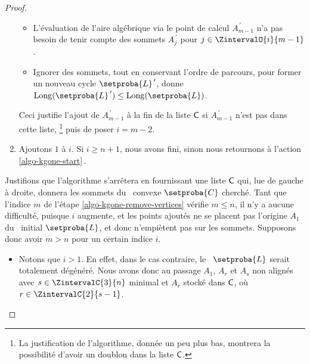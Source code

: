 \begin{proof}
\begin{enumerate}[label=\fbox{\small\bfseries\textsf{A\kern.25pt\arabic*}}]
\begin{itemize}
            \item L'évaluation de l'aire algébrique via le point de calcul $A^{\,\prime}_{m-1}$ n'a pas besoin de tenir compte des sommets $A^{\,\prime}_j$ pour $j \in \ZintervalO{i}{m-1}$.

            \item Ignorer des sommets, tout en conservant l'ordre de parcours, pour former un nouveau cycle $\setproba{L}^{\,\prime}$, donne $\cyclelen{\setproba{L}^{\,\prime}} \leq \cyclelen{\setproba{L}} $.
        \end{itemize}
        
        \noindent
        Ceci justifie l'ajout de
        $A^{\,\prime}_{m-1}$ à la fin de la liste $\mathsf{C}$ si $A^{\,\prime}_{m-1}$ n'est pas dans cette liste,%
        \footnote{
        	La justification de l'algorithme, donnée un peu plus bas, montrera la possibilité d'avoir un doublon dans la liste $\mathsf{C}$.
        }
        puis de poser $i = m - 2$.

	
		\item \label{algo-kgone-loop-back}
		Ajoutons $1$ à $i$.
		Si $i \geq n+1$, nous avons fini, sinon nous retournons à l'action \ref{algo-kgone-start}\,.
    \end{enumerate}
    
    \medskip
    
    Justifions que l'algorithme s'arrêtera en fournissant une liste $\mathsf{C}$ qui, lue de gauche à droite, donnera les sommets du \kgone\ convexe $\setproba{C}$ cherché.
    Tant que l'indice $m$ de l'étape \ref{algo-kgone-remove-vertices} vérifie $m \leq n$, il n'y a aucune difficulté, puisque $i$ augmente, et les points ajoutés ne se placent pas  l'origine $A_1$ du \ncycle\ initial $\setproba{L}$, et donc n'empiètent pas sur les  sommets. Supposons donc avoir $m > n$ pour un certain indice $i$.
    \begin{itemize}
        \item Notons que $i > 1$. 
        En effet,
        dans le cas contraire, le \ncycle\ $\setproba{L}$ serait totalement dégénéré. Nous avons donc au passage $A_1$, $A_r$ et $A_s$ non alignés avec $s \in \ZintervalC{3}{n}$ minimal et $A_r$ stocké dans $\mathsf{C}$, où $r \in \ZintervalC{2}{s-1}$. 



\end{itemize}
\end{proof}
